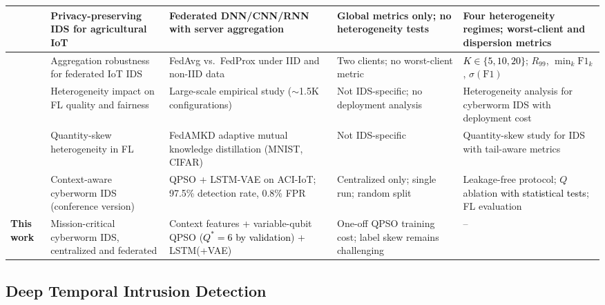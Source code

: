 \documentclass[conference]{IEEEtran}
\begin{document}
\begin{table}[!htbp]
\begin{tabular}{>{\raggedright\arraybackslash}p{1.0cm} >{\raggedright\arraybackslash}p{2.6cm} >{\raggedright\arraybackslash}p{4.0cm} >{\raggedright\arraybackslash}p{3.2cm} >{\raggedright\arraybackslash}p{4.4cm}}
\midrule

\cite{FRIHA202217} & Privacy-preserving IDS for agricultural IoT & Federated DNN/CNN/RNN with server aggregation & Global metrics only; no heterogeneity tests & Four heterogeneity regimes; worst-client and dispersion metrics \\

\midrule

\cite{herlambangfederated} & Aggregation robustness for federated IoT IDS & FedAvg vs.\ FedProx under IID and non-IID data & Two clients; no worst-client metric & \textcolor{black}{$K\in\{5,10,20\}$}; $R_{99}$, $\min_k\mathrm{F1}_k$, $\sigma(\mathrm{F1})$ \\

\midrule

\cite{abdelmoniemcomprehensive} & Heterogeneity impact on FL quality and fairness & Large-scale empirical study (${\sim}$1.5K configurations) & Not IDS-specific; no deployment analysis & Heterogeneity analysis for cyberworm IDS with deployment cost \\

\midrule

\cite{gefedamkd} & Quantity-skew heterogeneity in FL & FedAMKD adaptive mutual knowledge distillation (MNIST, CIFAR) & Not IDS-specific & Quantity-skew study for IDS with tail-aware metrics \\

\midrule

\cite{ajakweconquest} & Context-aware cyberworm IDS (conference version) & QPSO + LSTM-VAE on ACI-IoT; 97.5\% detection rate, 0.8\% FPR & Centralized only; single run; random split & Leakage-free protocol; $Q$ ablation \textcolor{black}{with statistical tests}; FL evaluation \\

\midrule

\textbf{This work} & Mission-critical cyberworm IDS, centralized and federated & Context features + variable-qubit QPSO (\textcolor{black}{$Q^{*}{=}6$ by validation}) + LSTM(+VAE) & One-off QPSO training cost; label skew remains challenging & -- \\

\hline\toprule
\end{tabular}
\end{table}

\subsection{Deep Temporal Intrusion Detection}
\end{document}
